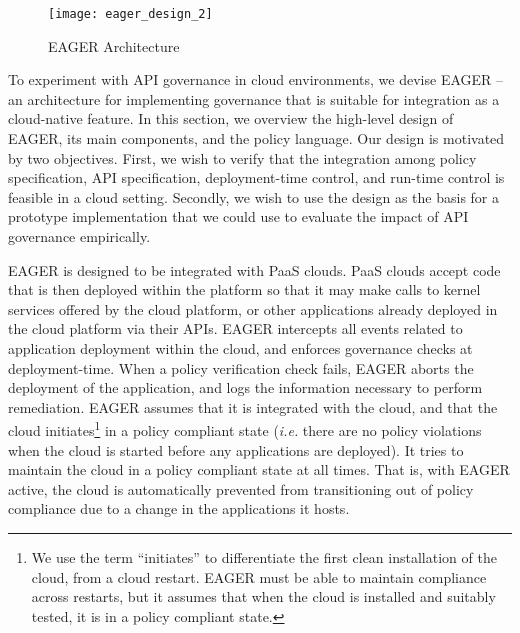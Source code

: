 \begin{figure*}[t]
\centering
\texttt{[image: eager\_design\_2]}
\caption{EAGER Architecture
\label{fig:eager_design}
}
\end{figure*}

To experiment with API governance in cloud environments, we devise EAGER
-- an architecture for implementing governance that is suitable for integration
as a cloud-native feature.
In this section, we
overview the high-level design of EAGER, its main
components, and the policy language.  Our design is motivated by two objectives.
First, we wish to verify that the integration among policy specification,
API specification,
deployment-time control, and run-time control is feasible in a cloud setting.
Secondly, we wish to use the design as the basis for a prototype
implementation that we could use to evaluate the impact of API governance
empirically.

EAGER is designed to be integrated with PaaS clouds. 
PaaS clouds accept code that is then
deployed within the platform so that it may make calls to kernel services
offered by the cloud platform, or other applications already
deployed in the cloud platform via their APIs.
EAGER intercepts all events related to application 
deployment within the cloud,
and enforces governance checks at deployment-time. 
When a policy verification check fails, 
EAGER aborts the deployment of the application, and logs the information
necessary to perform remediation.  EAGER assumes that it is integrated with
the cloud, and that the cloud initiates\footnote{We use the term
``initiates'' to differentiate the first clean installation of the cloud, from
a cloud restart.  EAGER must be able to maintain compliance across restarts,
but it assumes that when the cloud is installed and suitably tested, it is in
a policy compliant state.} 
in a policy compliant state ({\em i.e.} there are
no policy violations when the cloud is started before any applications are
deployed).  It tries to maintain the cloud
in a policy compliant state at all times.  That is, with EAGER active, the cloud
is
automatically prevented from transitioning out of policy compliance due to a
change in the applications it hosts.

